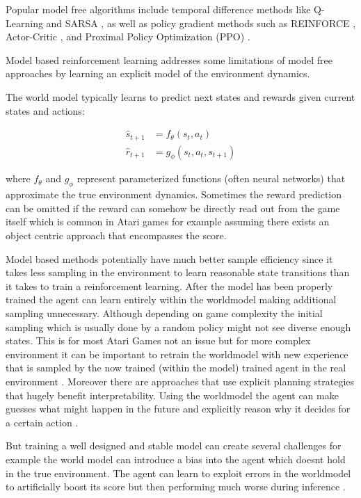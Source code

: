 \documentclass[
	english,
	ruledheaders=section,
	class=report,
	thesis={type=master},
	accentcolor=9c,
	custommargins=true,
	marginpar=false,
	parskip=half-,
	fontsize=11pt,
]{tudapub}
\begin{document}
Popular model free algorithms include temporal difference methods like Q-Learning
 \cite{watkins1989learning} and SARSA \cite{rummery1994line}, as well as policy 
 gradient methods such as REINFORCE \cite{williams1992simple}, Actor-Critic \cite{barto1983neuronlike}, 
 and Proximal Policy Optimization (PPO) \cite{schulman2017proximal}.

Model based reinforcement learning addresses some limitations of model free
approaches by learning an explicit model of the environment dynamics.

The world model typically learns to predict next states and rewards given
current states and actions:

\begin{align}
	\hat{s}_{t+1} & = f_\theta(s_t, a_t)        \\
	\hat{r}_{t+1} & = g_\phi(s_t, a_t, s_{t+1})
\end{align}

where $f_\theta$ and $g_\phi$ represent parameterized functions (often neural
networks) that approximate the true environment dynamics. Sometimes the reward
prediction can be omitted if the reward can somehow be directly read out from
the game itself which is common in Atari games for example assuming there
exists an object centric approach that encompasses the score.

Model based methods potentially have much better sample efficiency since it
takes less sampling in the environment to learn reasonable state transitions
than it takes to train a reinforcement learning. After the model has been
properly trained the agent can learn entirely within the worldmodel making
additional sampling unnecessary. Although depending on game complexity the
initial sampling which is usually done by a random policy might not see diverse
enough states. This is for most Atari Games not an issue but for more complex
environment it can be important to retrain the worldmodel with new experience
that is sampled by the now trained (within the model) trained agent in the real
environment \cite{janner2019trust,sutton1991dyna}. Moreover there are
approaches that use explicit planning strategies that hugely benefit
interpretability. Using the worldmodel the agent can make guesses what might
happen in the future and explicitly reason why it decides for a certain action
\cite{schrittwieser2020mastering,greydanus2018visualizing}.

But training a well designed and stable model can create several challenges for
example the world model can introduce a bias into the agent which doesnt hold
in the true environment. The agent can learn to exploit errors in the
worldmodel to artificially boost its score but then performing much worse
during inference \cite{talvitie2017self,lambert2020learning}.
\end{document}
